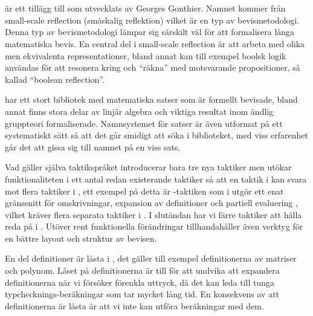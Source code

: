 \section{\ssr{}}
\ssr{} är ett tillägg till \coq{} som utvecklats av Georges Gonthier. Namnet
kommer från small-scale reflection (småskalig reflektion) vilket är en typ av
bevismetodologi. Denna typ av bevismetodologi lämpar sig särskilt väl för att
formalisera långa matematiska bevis. En central del i small-scale reflection är
att arbeta med olika men ekvivalenta representationer, bland annat kan till
exempel boolsk logik användas för att resonera kring och ``räkna'' med
motsvarande propositioner, så kallad ``boolean reflection''.

\ssr{} har ett stort bibliotek med matematiska satser som är formellt bevisade,
bland annat finns stora delar av linjär algebra och viktiga resultat inom
ändlig gruppteori formaliserade. Namnsystemet för satser är även utformat på
ett systematiskt sätt så att det går smidigt att söka i biblioteket, med viss
erfarenhet går det att gissa sig till namnet på en viss sats.

Vad gäller själva taktikspråket introducerar \ssr{} bara tre nya taktiker men
utökar funktionaliteten i ett antal redan existerande taktiker så att en taktik
i \ssr{} kan svara mot flera taktiker i \coq, ett exempel på detta är
-taktiken som i \ssr{} utgör ett enat gränssnitt för omskrivningar,
expansion av definitioner och partiell evaluering \cite{gonthier2008small},
vilket kräver flera separata taktiker i \coq. I slutändan har vi färre taktiker
att hålla reda på i \ssr{}. Utöver rent funktionella förändringar
tillhandahåller \ssr{} även verktyg för en bättre layout och struktur av
bevisen.

En del definitioner är låsta i \ssr{}, det gäller till exempel definitionerna
av matriser och polynom. Låset på definitionerna är till för att undvika att
expandera definitionerna när vi försöker förenkla uttryck, då det kan leda till
tunga typchecknings-beräkningar som tar mycket lång tid. En konsekvens av att
definitionerna är låsta är att vi inte kan utföra beräkningar med dem.
